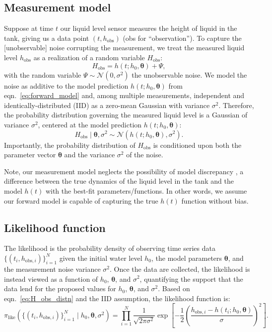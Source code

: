 \documentclass[openacc]{rsproca_new}%
\newcommand\thedata {$\{(t_i,h_{\text{obs}, i})\}_{i=1}^{N}$\xspace}
\newcommand\thedatanomath {\{(t_i,h_{\text{obs}, i})\}_{i=1}^{N}}
\begin{document}
\subsection{Measurement model}
Suppose at time $t$ our liquid level sensor measures the height of liquid in the tank, giving us a data point $(t, h_{\text{obs}})$ (obs for ``observation''). 
To capture the [unobservable] noise corrupting the measurement, we treat the measured liquid level $h_{\text{obs}}$ as a realization of a random variable $H_{\text{obs}}$:
\begin{equation}
	H_{\text{obs}} = h(t; h_0, \boldsymbol \theta)  + \Psi,
\end{equation}
with the random variable $\Psi \sim \mathcal{N}(0, \sigma^2)$ the unobservable noise. 
We model the noise as additive to the model prediction $h(t; h_0, \boldsymbol \theta)$ from eqn.~\ref{eq:forward_model} and, among multiple measurements, independent and identically-distributed (IID) as a zero-mean Gaussian with variance $\sigma^2$. 
Therefore, the probability distribution governing the measured liquid level is a Gaussian of variance $\sigma^2$, centered at the model prediction $h(t;h_0, \boldsymbol \theta)$:
\begin{equation}
	H_{\text{obs}} \mid \boldsymbol  \theta, \sigma^2 \sim \mathcal{N}(h(t; h_0, \boldsymbol \theta), \sigma^2). \label{eq:H_obs_distn}
\end{equation} Importantly, the probability distribution of $H_{\text{obs}}$ is conditioned upon both the parameter vector $\boldsymbol  \theta$ and the variance $\sigma^2$ of the noise.


Note, our measurement model neglects the possibility of model discrepancy \cite{brynjarsdottir2014learning,kennedy2001bayesian}, a difference between the true dynamics of the liquid level in the tank and the model $h(t)$ with the best-fit parameters/functions. In other words, we assume our forward model is capable of capturing the true $h(t)$ function without bias.


\subsection{Likelihood function}
The likelihood is the probability density of observing time series data \thedata given the initial water level $h_0$, the model parameters $\boldsymbol \theta$, and the measurement noise variance $\sigma^2$. Once the data are collected, the likelihood is instead viewed as a function of $h_0$, $\boldsymbol \theta$, and $\sigma^2$, quantifying the support that the data lend for the proposed values for $h_0$, $\boldsymbol \theta$, and $\sigma^2$. Based on eqn.~\ref{eq:H_obs_distn} and the IID assumption, the likelihood function is:
\begin{equation}
 \pi_{\text{like}}(\thedatanomath \mid h_0, \boldsymbol \theta, \sigma^2 ) = \prod_{i=1}^N \frac{1}{\sqrt{2\pi\sigma^2}} \exp \left[-\frac{1}{2}\left(\frac{h_{\text{obs}, i} - h(t_i; h_0, \boldsymbol\theta)}{\sigma} \right)^2 \right]. \label{eq:like}
\end{equation}
\end{document}

